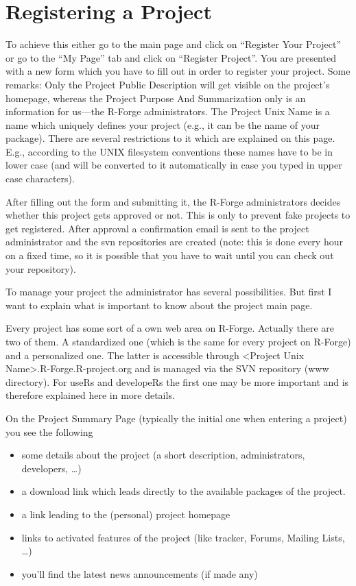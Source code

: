 \section{Registering a Project}

To achieve this either go to the main page and click on ``Register
Your Project'' or go to the ``My Page'' tab and click on ``Register
Project''. You are presented with a new form which you have to fill
out in order to register your project. Some remarks: Only the Project
Public Description will get visible on the project's homepage, whereas
the Project Purpose And Summarization only is an information for
us---the R-Forge administrators. The Project Unix Name is a name which
uniquely defines your project (e.g., it can be the name of your
package). There are several restrictions to it which are explained on this
page. E.g., according to the UNIX
filesystem conventions these names have to be in lower case (and will
be converted to it automatically in case you typed in upper case
characters).

After filling out the form and submitting it, the R-Forge
administrators decides whether this project gets approved or not. This
is only to prevent fake projects to get registered. After approval a
confirmation email is sent to the project administrator and the svn
repositories are created (note: this is done every hour on a fixed
time, so it is possible that you have to wait until you can check out
your repository).

To manage your project the administrator has several
possibilities. But first I want to explain what is important to know
about the project main page.

Every project has some sort of a own web area on R-Forge. Actually
there are two of them. A standardized one (which is the same for every
project on R-Forge) and a personalized one. The latter is accessible
through <Project Unix Name>.R-Forge.R-project.org and is managed via
the SVN repository (www directory). For useRs and developeRs the first
one may be more important and is therefore explained here in more
details.

On the Project Summary Page (typically the initial one when entering a
project) you see the following

\begin{itemize}
\item some details about the project (a short description,
  administrators, developers, \ldots{})

\item a download link which leads directly to the available packages
  of the project.
\item a link leading to the (personal) project homepage

\item links to activated features of the project (like tracker,
  Forums, Mailing Lists, \ldots{})

\item you'll find the latest news announcements (if made any)

\end{itemize}

